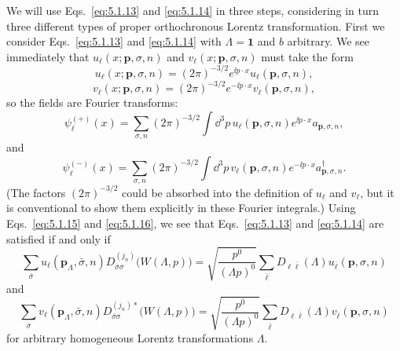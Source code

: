 We will use Eqs.~\eqref{eq:5.1.13} and \eqref{eq:5.1.14} in three steps, considering in turn
three different types of proper orthochronous Lorentz transformation.
First we consider Eqs.~\eqref{eq:5.1.13} and \eqref{eq:5.1.14} with $\Lambda=\mathbf{1}$ and
$b$ arbitrary. We see immediately that $u_\ell(x;\mathbf{p},\sigma,n)$ and
$v_\ell(x;\mathbf{p},\sigma,n)$ must take the form
\begin{equation}
  u_\ell(x;\mathbf{p},\sigma,n)=(2\pi)^{-3/2}e^{\ii p\cdot x}
  u_\ell(\mathbf{p},\sigma,n),
  \tag{5.1.15}\label{eq:5.1.15}
\end{equation}
\begin{equation}
  v_\ell(x;\mathbf{p},\sigma,n)=(2\pi)^{-3/2}e^{-\ii p\cdot x}
  v_\ell(\mathbf{p},\sigma,n),
  \tag{5.1.16}\label{eq:5.1.16}
\end{equation}
so the fields are Fourier transforms:
\begin{equation}
  \psi^{(+)}_\ell(x)=\sum_{\sigma,n}(2\pi)^{-3/2}\int \dd^3p\,
  u_\ell(\mathbf{p},\sigma,n)e^{\ii p\cdot x}a_{\mathbf{p},\sigma,n},
  \tag{5.1.17}\label{eq:5.1.17}
\end{equation}
and
\begin{equation}
  \psi^{(-)}_\ell(x)=\sum_{\sigma,n}(2\pi)^{-3/2}\int \dd^3p\,
  v_\ell(\mathbf{p},\sigma,n)e^{-\ii p\cdot x}a^\dagger_{\mathbf{p},\sigma,n}.
  \tag{5.1.18}\label{eq:5.1.18}
\end{equation}
(The factors $(2\pi)^{-3/2}$ could be absorbed into the definition of
$u_\ell$ and $v_\ell$, but it is conventional to show them explicitly in
these Fourier integrals.) Using Eqs.~\eqref{eq:5.1.15} and \eqref{eq:5.1.16}, we see that
Eqs.~\eqref{eq:5.1.13} and \eqref{eq:5.1.14} are satisfied if and only if
\begin{equation}
  \sum_{\bar\sigma}u_\ell(\mathbf{p}_\Lambda,\bar\sigma,n)
  D^{(j_n)}_{\bar\sigma\sigma}\bigl(W(\Lambda,p)\bigr)
  =\sqrt{\frac{p^0}{(\Lambda p)^0}}
  \sum_{\bar\ell}D_{\ell\bar\ell}(\Lambda)
  u_{\bar\ell}(\mathbf{p},\sigma,n)
  \tag{5.1.19}\label{eq:5.1.19}
\end{equation}
and
\begin{equation}
  \sum_{\bar\sigma}v_\ell(\mathbf{p}_\Lambda,\bar\sigma,n)
  D^{(j_n)*}_{\bar\sigma\sigma}\bigl(W(\Lambda,p)\bigr)
  =\sqrt{\frac{p^0}{(\Lambda p)^0}}
  \sum_{\bar\ell}D_{\ell\bar\ell}(\Lambda)
  v_{\bar\ell}(\mathbf{p},\sigma,n)
  \tag{5.1.20}\label{eq:5.1.20}
\end{equation}
for arbitrary homogeneous Lorentz transformations $\Lambda$.


